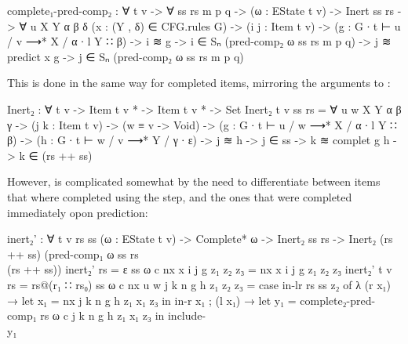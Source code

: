 		\begin{code}
			  complete₁-pred-comp₂ : ∀ {t v} -> ∀ ss rs m p q ->
			    (ω : EState t v) ->
			    Inert ss rs ->
			    ∀ {u X Y α β δ}
			    (x : (Y , δ) ∈ CFG.rules G) ->
			    (i j : Item t v) ->
			    (g : G ∙ t ⊢ u / v ⟶* X / α ∙ l Y ∷ β) ->
			    i ≋ g -> 
			    i ∈ Sₙ (pred-comp₂ ω ss rs m p q) ->
			    j ≋ predict x g ->
			      j ∈ Sₙ (pred-comp₂ ω ss rs m p q)
		\end{code}

		This is done in the same way for completed items, mirroring the
		arguments to :

		\begin{code}
			  Inert₂ : ∀ {t v} -> Item t v * -> Item t v * -> Set
			  Inert₂ {t} {v} ss rs =
			    ∀ {u w X Y α β γ} ->
			    (j k : Item t v) ->
			    (w ≡ v -> Void) ->
			    (g : G ∙ t ⊢ u / w ⟶* X / α ∙ l Y ∷ β) ->
			    (h : G ∙ t ⊢ w / v ⟶* Y / γ ∙ ε) ->
			    j ≋ h -> j ∈ ss ->
			    k ≋ complet g h ->
			      k ∈ (rs ++ ss)
		\end{code}

		However,  is complicated somewhat by the need to
		differentiate between items that where completed using the
		 step, and the ones that were completed immediately opon
		prediction: 

		\begin{code}
			  inert₂' : ∀ {t v rs ss} (ω : EState t v) ->
			    Complete* ω ->
			    Inert₂ ss rs ->
			    Inert₂ (rs ++ ss) (pred-comp₁ ω ss rs \\ (rs ++ ss))
			  inert₂' {rs = ε} {ss} ω c nx x i j g z₁ z₂ z₃ = nx x i j g z₁ z₂ z₃
			  inert₂' {t} {v} {rs = rs@(r₁ ∷ rs₀)} {ss} ω c nx {u} {w} j k n g h z₁ z₂ z₃ =
			    case in-lr rs ss z₂ of
			      λ { (r x₁) →
			        let x₁ = nx j k n g h z₁ x₁ z₃  in
			        in-r x₁
			      ; (l x₁) →
			        let y₁ = complete₂-pred-comp₁ rs ω c j k n g h z₁ x₁ z₃ in
			        include-\\ y₁
			      }
		\end{code}

